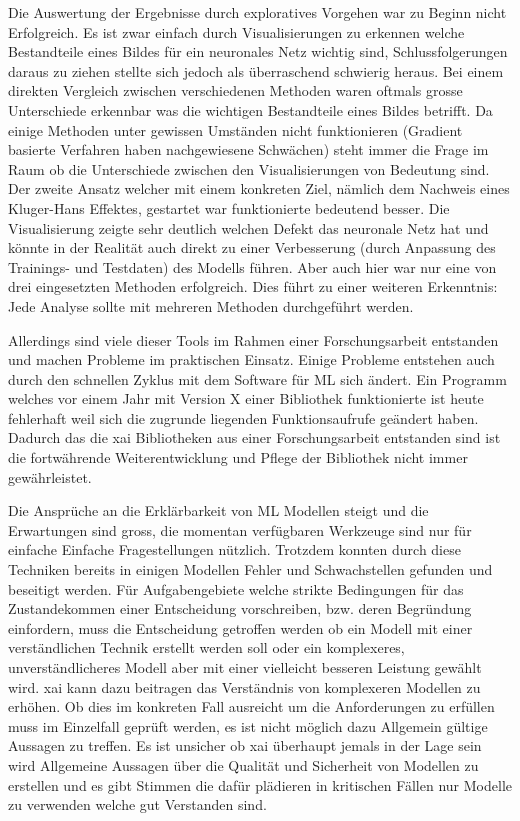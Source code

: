 \documentclass[
  12pt, %
  a4paper, %
  oneside, %
  openany, 
  numbers=noenddot, %
  BCOR=5mm, %
  parskip=half*, %
  thesis, %
]{bfhbook}
\begin{document}
Die Auswertung der Ergebnisse durch exploratives Vorgehen war zu Beginn nicht Erfolgreich. Es ist zwar einfach durch Visualisierungen zu erkennen welche Bestandteile eines Bildes für ein neuronales Netz wichtig sind, Schlussfolgerungen daraus zu ziehen stellte sich jedoch als überraschend schwierig heraus. Bei einem direkten Vergleich zwischen verschiedenen Methoden waren oftmals grosse Unterschiede erkennbar was die wichtigen Bestandteile eines Bildes betrifft. Da einige Methoden unter gewissen Umständen nicht funktionieren (Gradient basierte Verfahren haben nachgewiesene Schwächen) steht immer die Frage im Raum ob die Unterschiede zwischen den Visualisierungen von Bedeutung sind. Der zweite Ansatz welcher mit einem konkreten Ziel, nämlich dem Nachweis eines Kluger-Hans Effektes, gestartet war funktionierte bedeutend besser. Die Visualisierung zeigte sehr deutlich welchen Defekt das neuronale Netz hat und könnte in der Realität auch direkt zu einer Verbesserung (durch Anpassung des Trainings- und Testdaten) des Modells führen. Aber auch hier war nur eine von drei eingesetzten Methoden erfolgreich. Dies führt zu einer weiteren Erkenntnis: Jede Analyse sollte mit mehreren Methoden durchgeführt werden.

Allerdings sind viele dieser Tools im Rahmen einer Forschungsarbeit entstanden und machen Probleme im praktischen Einsatz. Einige Probleme entstehen auch durch den schnellen Zyklus mit dem Software für \Gls{ML} sich ändert. Ein Programm welches vor einem Jahr mit Version X einer Bibliothek funktionierte ist heute fehlerhaft weil sich die zugrunde liegenden Funktionsaufrufe geändert haben. Dadurch das die \Gls{xai} Bibliotheken aus einer Forschungsarbeit entstanden sind ist die fortwährende Weiterentwicklung und Pflege der Bibliothek nicht immer gewährleistet. 

Die Ansprüche an die Erklärbarkeit von \Gls{ML} Modellen steigt und die Erwartungen sind gross, die momentan verfügbaren Werkzeuge sind nur für einfache Einfache Fragestellungen nützlich. Trotzdem konnten durch diese Techniken bereits in einigen Modellen Fehler und Schwachstellen gefunden und beseitigt werden. Für Aufgabengebiete welche strikte Bedingungen für das Zustandekommen einer Entscheidung vorschreiben, bzw. deren Begründung einfordern, muss die Entscheidung getroffen werden ob ein Modell mit einer verständlichen Technik erstellt werden soll oder ein komplexeres, unverständlicheres Modell aber mit einer vielleicht besseren Leistung gewählt wird. \Gls{xai} kann dazu beitragen das Verständnis von komplexeren Modellen zu erhöhen. Ob dies im konkreten Fall ausreicht um die Anforderungen zu erfüllen muss im Einzelfall geprüft werden, es ist nicht möglich dazu Allgemein gültige Aussagen zu treffen. Es ist unsicher ob \Gls{xai} überhaupt jemals in der Lage sein wird Allgemeine Aussagen über die Qualität und Sicherheit von Modellen zu erstellen und es gibt Stimmen die dafür plädieren in kritischen Fällen nur Modelle zu verwenden welche gut Verstanden sind.
\end{document}
